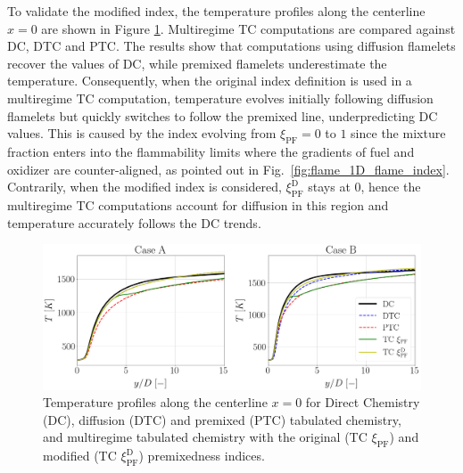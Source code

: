 \documentclass[preprint,12pt,authoryear]{elsarticle}
\begin{document}
{To validate the modified index, the temperature profiles along the centerline $x = 0$ are shown in Figure \ref{fig:app:fts_profiles_T_line_x00}. Multiregime TC computations are compared against DC, DTC and PTC. The results show that computations using diffusion flamelets recover the values of DC, while premixed flamelets underestimate the temperature. Consequently, when the original index definition is used in a multiregime TC computation, temperature evolves initially following diffusion flamelets but quickly switches to follow the premixed line, underpredicting DC values. This is caused by the index evolving from $\xi_\mathrm{PF} = 0$ to $1$ since the mixture fraction enters into the flammability limits where the gradients of fuel and oxidizer are counter-aligned, as pointed out in Fig.~\ref{fig:flame_1D_flame_index}. Contrarily, when the modified index is considered, $\xi_\mathrm{PF}^\mathrm{D}$ stays at $0$, hence the multiregime TC computations account for diffusion in this region and temperature accurately follows the DC trends. 

\clearpage


\begin{figure}[h!]
    \centering
	\includegraphics[scale=0.25]{./figures_appendix/fts_profiles_T_line_x00}
	\caption{Temperature profiles along the centerline $x = 0$ for Direct Chemistry (DC), diffusion (DTC) and premixed (PTC) tabulated chemistry, and multiregime tabulated chemistry with the original (TC $\xi_\mathrm{PF}$) and modified (TC $\xi_\mathrm{PF}^\mathrm{D}$) premixedness indices.}
	\label{fig:app:fts_profiles_T_line_x00}
\end{figure}






%


}
\end{document}
